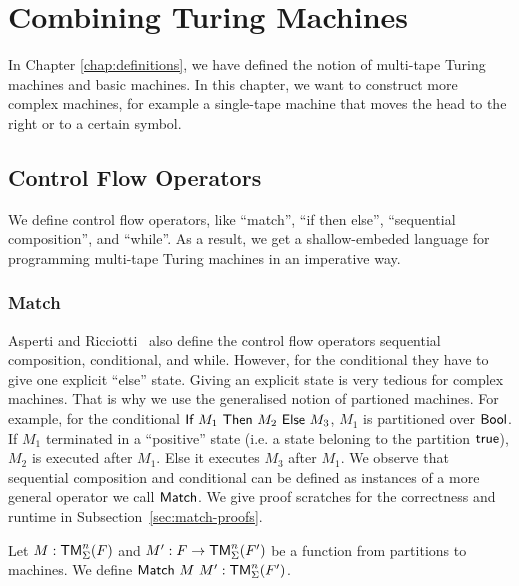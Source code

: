 \chapter{Combining Turing Machines}
\label{chap:combining}

In Chapter \ref{chap:definitions}, we have defined the notion of multi-tape Turing machines and basic machines.  In this chapter, we want to construct
more complex machines, for example a single-tape machine that moves the head to the right or to a certain symbol.

\section{Control Flow Operators}
\label{sec:control}

We define control flow operators, like ``match'', ``if then else'', ``sequential composition'', and ``while''.
As a result, we get a shallow-embeded language for programming multi-tape Turing machines in an imperative way.

\subsection{Match}
\label{sec:match}

Asperti and Ricciotti~\cite{asperti2015} also define the control flow operators sequential composition, conditional, and while.  However, for the
conditional they have to give one explicit ``else'' state.  Giving an explicit state is very tedious for complex machines.  That is why we use the
generalised notion of partioned machines.  For example, for the conditional $\textsf{If}~M_1~\textsf{Then}~M_2~\textsf{Else}~M_3$, $M_1$ is partitioned over $\textsf{Bool}$.  If $M_1$
terminated in a ``positive'' state (i.e. a state beloning to the partition $\textsf{true}$), $M_2$ is executed after $M_1$.  Else it executes $M_3$ after
$M_1$.  We observe that sequential composition and conditional can be defined as instances of a more general operator we call $\textsf{Match}$.  We give
proof scratches for the correctness and runtime in Subsection~\ref{sec:match-proofs}.

Let $M : \textsf{TM}_\Sigma^n(F)$ and $M' : F \rightarrow \textsf{TM}_\Sigma^n(F')$ be a function from partitions to machines.  We define
$\textsf{Match}~M~M' : \textsf{TM}_\Sigma^n(F')$.

